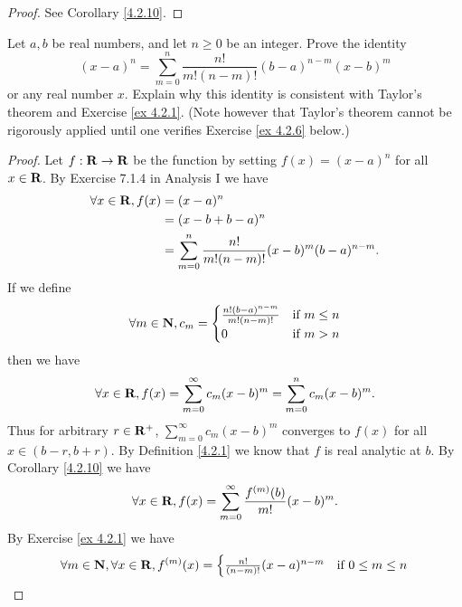 \begin{proof}
    See Corollary \ref{4.2.10}.
\end{proof}

\begin{exercise}\label{ex 4.2.5}
    Let \(a, b\) be real numbers, and let \(n \geq 0\) be an integer.
    Prove the identity
    \[
        (x - a)^n = \sum_{m = 0}^n \frac{n!}{m! (n - m)!} (b - a)^{n - m} (x - b)^m
    \]
    or any real number \(x\).
    Explain why this identity is consistent with Taylor's theorem and Exercise \ref{ex 4.2.1}.
    (Note however that Taylor's theorem cannot be rigorously applied until one verifies Exercise \ref{ex 4.2.6} below.)
\end{exercise}

\begin{proof}
    Let \(f : \mathbf{R} \to \mathbf{R}\) be the function by setting \(f(x) = (x - a)^n\) for all \(x \in \mathbf{R}\).
    By Exercise 7.1.4 in Analysis I we have
    \begin{align*}
        \forall x \in \mathbf{R}, f(x) & = (x - a)^n                                                        \\
                               & = (x - b + b - a)^n                                                \\
                               & = \sum_{m = 0}^n \frac{n!}{m! (n - m)!} (x - b)^m (b - a)^{n - m}.
    \end{align*}
    If we define
    \[
        \forall m \in \mathbf{N}, c_m = \begin{cases}
            \frac{n! (b - a)^{n - m}}{m! (n - m)!} & \text{if } m \leq n \\
            0                                      & \text{if } m > n
        \end{cases}
    \]
    then we have
    \[
        \forall x \in \mathbf{R}, f(x) = \sum_{m = 0}^\infty c_m (x - b)^m = \sum_{m = 0}^n c_m (x - b)^m.
    \]
    Thus for arbitrary \(r \in \mathbf{R}^+\), \(\sum_{m = 0}^\infty c_m (x - b)^m\) converges to \(f(x)\) for all \(x \in (b - r, b + r)\).
    By Definition \ref{4.2.1} we know that \(f\) is real analytic at \(b\).
    By Corollary \ref{4.2.10} we have
    \begin{align*}
        \forall x \in \mathbf{R}, f(x) = \sum_{m = 0}^\infty \frac{f^{(m)}(b)}{m!} (x - b)^m.
    \end{align*}
    By Exercise \ref{ex 4.2.1} we have
    \[
        \forall m \in \mathbf{N}, \forall x \in \mathbf{R}, f^{(m)}(x) = \begin{cases}
            \frac{n!}{(n - m)!} (x - a)^{n - m} & \text{if } 0 \leq m \leq n \\

\end{cases}\]
\end{proof}
